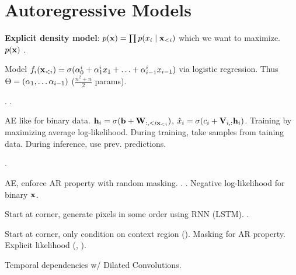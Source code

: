 \section{Autoregressive Models}
\textbf{Explicit density model}: \(p(\vb{x}) = \prod p(x_i \mid \vb{x}_{<i})\) which we want to maximize. \(p(\vb{x})\)
.

\begin{definition}[FVSBN]
    Model \(f_i(\vb{x}_{<i}) = \sigma(\alpha_0^i + \alpha_1^ix_1 + \ldots + \alpha_{i-1}^i x_{i-1})\) via logistic regression. Thus \(\Theta = (\alpha_1, \ldots \alpha_{i-1})\) (\(\frac{n^2 + n}{2}\) params).
    
    .
    .
\end{definition}

\begin{definition}[NADE]
    AE like for binary data.
    \(\vb{h}_i = \sigma(\vb{b} + \vb{W}_{:, <i \vb{x}_{<i}})\), \(\hat x_i = \sigma(c_i + \vb{V}_{i, :} \vb{h}_i)\).
    Training by maximizing average log-likelihood.
    During training, take samples from taining data. During inference, use prev. predictions.

    .
\end{definition}

\begin{definition}[MADE]
    AE, enforce AR property with random masking.
    .
    .
    Negative log-likelihood for binary \(\vb{x}\).
\end{definition}

\begin{definition}[PixelRNN]
    Start at corner, generate pixels in some order using RNN (LSTM). .
\end{definition}

\begin{definition}[PixelCNN]
    Start at corner, only condition on context region (). Masking for AR property. Explicit likelihood (, ).
\end{definition}

\begin{definition}[Wavenet]
    Temporal dependencies w/ Dilated Convolutions.
\end{definition}

